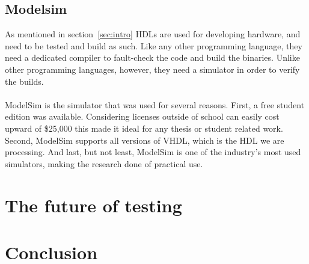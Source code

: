 \documentclass[11pt,british]{article}
\begin{document}
\subsection{Modelsim}
As mentioned in section~\ref{sec:intro} \gls{HDL}s are used for developing hardware, and need to be tested and build as such. Like any other programming language, they need a dedicated compiler to fault-check the code and build the binaries. Unlike other programming languages, however, they need a simulator in order to verify the builds.
\\
\\
ModelSim is the simulator that was used for several reasons. First, a free student edition was available. Considering licenses  outside of school can easily cost upward of \$25,000 this made it ideal for any thesis or student related work. Second, ModelSim supports all versions of \gls{VHDL}, which is the \gls{HDL} we are processing. And last, but not least, ModelSim is one of the industry's most used simulators, making the research done of practical use.


\newpage{}
\section{The future of testing}

\newpage{}
\section{Conclusion}

\pagebreak{}

\printbibliography

%
%
%
%
%
%
%
%
\end{document}
